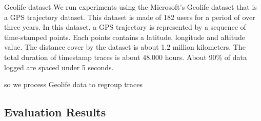 Geolife dataset
We run experiments using the Microsoft’s Geolife
dataset that is a GPS trajectory dataset.
This dataset is made of 182 users for a period of over three years.
In this dataset, a GPS trajectory is represented by a
sequence of time-stamped points.
Each points contains a latitude, longitude and altitude value.
The distance cover by the dataset is about 1.2 million kilometers.
The total duration of timestamp traces is about 48.000 hours.
About 90\% of data logged are spaced under 5 seconds.


so we process Geolife data to regroup traces 

\subsection{Evaluation Results}
